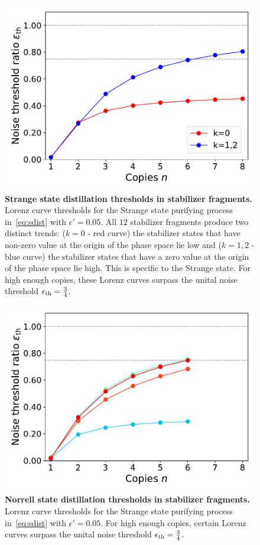 \documentclass[pra,
aps,
twocolumn,
superscriptaddress,
groupedaddress,
nofootinbib,
reprint
]{revtex4-1}
\begin{document}
\begin{figure}[h]
    \centering
    \includegraphics[scale=0.5]{figs/stab_distill.pdf}
    \caption{\textbf{Strange state distillation thresholds in stabilizer fragments.} Lorenz curve thresholds for the Strange state purifying process in~\cref{eq:sdist} with $\epsilon' = 0.05$.
    All $12$ stabilizer fragments produce two distinct trends: ($k=0$ - red curve) the stabilizer states that have non-zero value at the origin of the phase space lie low and ($k=1,2$ - blue curve) the stabilizer states that have a zero value at the origin of the phase space lie high.
    This is specific to the Strange state.
    For high enough copies, these Lorenz curves surpass the unital noise threshold $\epsilon_{\rm{th}} = \frac{3}{4}$.
    }
    \label{fig:stab_distill}
\end{figure}

\begin{figure}[h]
    \centering
    \includegraphics[scale=0.5]{figs/stab_distill_norrell.pdf}
    \caption{\textbf{Norrell state distillation thresholds in stabilizer fragments.} Lorenz curve thresholds for the Strange state purifying process in~\cref{eq:sdist} with $\epsilon' = 0.05$.
    For high enough copies, certain Lorenz curves surpass the unital noise threshold $\epsilon_{\rm{th}} = \frac{3}{4}$.
    }
    \label{fig:stab_distill_norrell}
\end{figure}
\end{document}
